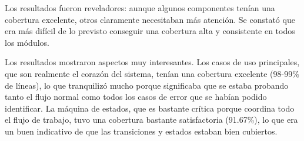 Los resultados fueron reveladores: aunque algunos componentes tenían una cobertura excelente, otros claramente necesitaban más atención. Se constató que era más difícil de lo previsto conseguir una cobertura alta y consistente en todos los módulos.

\begin{table}[ht]
    \centering
    \small
    \caption{Métricas de cobertura de código por componente}
    \label{tab:code_coverage_metrics}
\end{table}

Los resultados mostraron aspectos muy interesantes. Los casos de uso principales, que son realmente el corazón del sistema, tenían una cobertura excelente (98-99\% de líneas), lo que tranquilizó mucho porque significaba que se estaba probando tanto el flujo normal como todos los casos de error que se habían podido identificar. La máquina de estados, que es bastante crítica porque coordina todo el flujo de trabajo, tuvo una cobertura bastante satisfactoria (91.67\%), lo que era un buen indicativo de que las transiciones y estados estaban bien cubiertos.

